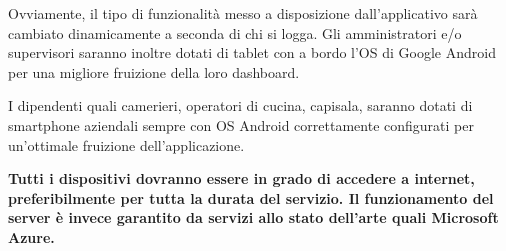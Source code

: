 \documentclass{article}
\numberwithin{equation}{section}
\numberwithin{figure}{section}
\begin{document}
    \begin{flushleft}
      {\large Ovviamente, il tipo di funzionalità messo a disposizione dall'applicativo sarà cambiato
        dinamicamente a seconda di chi si logga. 
        Gli amministratori e/o supervisori saranno inoltre dotati di tablet con a bordo l'OS di Google Android per
        una migliore fruizione della loro dashboard.}

      \vspace{1cm}

    {\large I dipendenti quali camerieri, operatori di cucina, capisala, saranno dotati di smartphone aziendali sempre con OS Android correttamente configurati per un'ottimale fruizione dell'applicazione.}
      \vspace{1cm}

    {\large \textbf{Tutti i dispositivi dovranno essere in grado di accedere a internet, preferibilmente per tutta la durata del servizio. Il funzionamento del server è invece garantito da servizi allo stato dell'arte quali Microsoft Azure.}}
    \end{flushleft}
    
    
    
    
    
    
    
    
    
    
    
    
    
    
    
   
    
\end{document}
